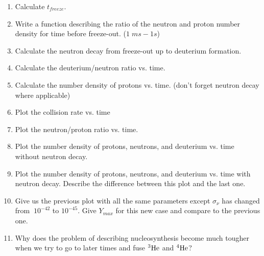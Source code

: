 \documentclass[12pt,preprint]{aastex}
\begin{document}
\begin{enumerate}
\begin{enumerate}
	\item Calculate $t_{freeze}$.
	 
	\item Write a function describing the ratio of the neutron and proton number density for time before freeze-out. ($1\;ms-1s$) 
	
	\item Calculate the neutron decay from freeze-out up to deuterium formation. 
	
	\item Calculate the deuterium/neutron ratio vs. time. 
	
	\item Calculate the number density of protons vs. time. (don't forget neutron decay where applicable)
	
	\item Plot the collision rate vs. time
	
	\item Plot the neutron/proton ratio vs. time. 
	
	\item Plot the number density of protons, neutrons, and deuterium vs. time without neutron decay.
	
	\item Plot the number density of protons, neutrons, and deuterium vs. time with neutron decay. Describe the difference between this plot and the last one.
	
	\item Give us the previous plot with all the same parameters except $\sigma_{\nu}$ has changed from $~ 10^{-42}$ to $10^{-45}$. Give $Y_{max}$ for this new case and compare to the previous one.
	
	\item Why does the problem of describing nucleosynthesis become much tougher when we try to go to later times and fuse $\rm{^3He}$ and $\rm{^4He}$? 

\end{enumerate}

\end{enumerate}
\end{document}
